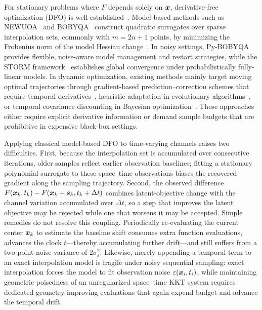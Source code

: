 For stationary problems where $F$ depends solely on $\boldsymbol{x}$, derivative-free optimization (DFO) is well established~\cite{ConnScheinbergVicente2009,AudetHare2017,LarsonMenickellyWild2019}. Model-based methods such as NEWUOA~\cite{Powell2006NEWUOA} and BOBYQA~\cite{Powell2009BOBYQA} construct quadratic surrogates over sparse interpolation sets, commonly with $m=2n+1$ points, by minimizing the Frobenius norm of the model Hessian change~\cite{Powell2004LeastFrobenius}. In noisy settings, Py-BOBYQA~\cite{CartisRoberts2019} provides flexible, noise-aware model management and restart strategies, while the STORM framework~\cite{ChenMenickellyScheinberg2018,BlanchetCartisMenickellyScheinberg2019} establishes global convergence under probabilistically fully-linear models. In dynamic optimization, existing methods mainly target moving optimal trajectories through gradient-based prediction--correction schemes that require temporal derivatives~\cite{Fazlyab2018,SimonettoDallAnese2020}, heuristic adaptation in evolutionary algorithms~\cite{Yazdani2025}, or temporal covariance discounting in Bayesian optimization~\cite{MoralesEnciso2015}. These approaches either require explicit derivative information or demand sample budgets that are prohibitive in expensive black-box settings.

Applying classical model-based DFO to time-varying channels raises two difficulties. First, because the interpolation set is accumulated over consecutive iterations, older samples reflect earlier observation baselines; fitting a stationary polynomial surrogate to these space--time observations biases the recovered gradient along the sampling trajectory. Second, the observed difference $F(\boldsymbol{x}_k, t_k) - F(\boldsymbol{x}_k+\boldsymbol{s}_k, t_k+\Delta t)$ combines latent-objective change with the channel variation accumulated over $\Delta t$, so a step that improves the latent objective may be rejected while one that worsens it may be accepted. Simple remedies do not resolve this coupling. Periodically re-evaluating the current center $\boldsymbol{x}_k$ to estimate the baseline shift consumes extra function evaluations, advances the clock $t$---thereby accumulating further drift---and still suffers from a two-point noise variance of $2\sigma_\varepsilon^2$. Likewise, merely appending a temporal term to an exact interpolation model is fragile under noisy sequential sampling: exact interpolation forces the model to fit observation noise $\varepsilon(\boldsymbol{x}_i, t_i)$, while maintaining geometric poisedness of an unregularized space--time KKT system requires dedicated geometry-improving evaluations that again expend budget and advance the temporal drift.

